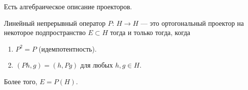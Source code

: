 \documentclass[../complex-analysis.tex]{subfiles}
\begin{document}
Есть алгебраическое описание проекторов.

\begin{thm}
 Линейный непрерывный оператор $ P \colon\,H \to H$  --- это ортогональный проектор на некоторое подпространство $ E \subset H $ тогда и только тогда, когда
 \begin{enumerate}
  \item $ P^{2} = P $ (идемпотентность).
  \item $ (Ph, g) = (h,Pg) $ для любых $ h,g \in H $.
 \end{enumerate} Более того, $ E = P(H) $.
\end{thm}
\end{document}
